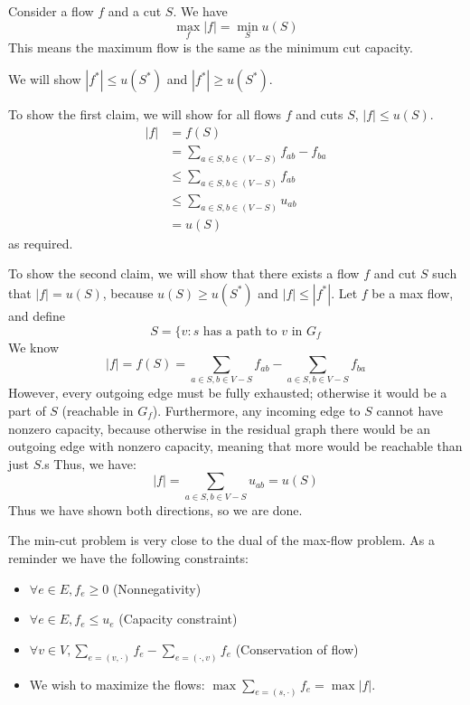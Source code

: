 \begin{theorem}
    Consider a flow $f$ and a cut $S$. We have
    \[\max_f |f| = \min_S u(S)\]
    This means the maximum flow is the same as the minimum cut capacity.
    
    \begin{proof*}
        We will show $|f^*| \leq u(S^*)$ and $|f^*| \geq u(S^*)$.

        To show the first claim, we will show for all flows $f$ and cuts $S$, $|f| \leq u(S)$.
        \begin{align*}
            |f| &= f(S) \\
            &= \sum_{a \in S, b \in (V - S)} f_{ab} - f_{ba} \\
            &\leq \sum_{a \in S, b \in (V - S)} f_{ab} \\
            &\leq \sum_{a \in S, b \in (V - S)} u_{ab} \\
            &= u(S)
        \end{align*}
        as required.

        To show the second claim, we will show that there exists a flow $f$ and cut $S$ such that
        $|f| = u(S)$, because $u(S) \geq u(S^*)$ and $|f| \leq |f^*|$. Let $f$ be a max flow, and define
        \[ S = \{ v: \text{$s$ has a path to $v$ in $G_f$} \]
        We know \[|f| = f(S) = \sum_{a \in S, b \in V - S} f_{ab} - \sum_{a \in S, b \in V - S} f_{ba}\]
        However, every outgoing edge must be fully exhausted; otherwise it would be a part of $S$ (reachable in $G_f$).
        Furthermore, any incoming edge to $S$ cannot have nonzero capacity, because otherwise in the residual graph there would be
        an outgoing edge with nonzero capacity, meaning that more would be reachable than just $S$.s
        Thus, we have:
        \[ |f| = \sum_{a \in S, b \in V - S} u_{ab} = u(S) \]
        Thus we have shown both directions, so we are done.
    \end{proof*}
\end{theorem}

The min-cut problem is very close to the dual of the max-flow problem. As a reminder we have the following constraints:
\begin{itemize}
    \item $\forall e \in E, f_e \geq 0$ (Nonnegativity)
    \item $\forall e \in E, f_e \leq u_e$ (Capacity constraint)
    \item $\forall v \in V, \sum_{e = (v, \cdot)} f_e - \sum_{e = (\cdot, v)} f_e$ (Conservation of flow)
    \item We wish to maximize the flows: $\max \sum_{e = (s, \cdot)} f_e = \max |f|$.
\end{itemize}

